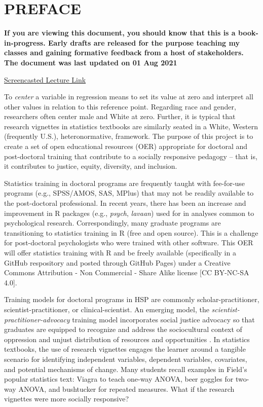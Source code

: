 \documentclass[
  english,
]{book}
\begin{document}
\hypertarget{preface}{%
\chapter*{PREFACE}\label{preface}}

\textbf{If you are viewing this document, you should know that this is a book-in-progress. Early drafts are released for the purpose teaching my classes and gaining formative feedback from a host of stakeholders. The document was last updated on 01 Aug 2021}

\href{https://spu.hosted.panopto.com/Panopto/Pages/Viewer.aspx?id=c932455e-ef06-444a-bdca-acf7012d759a}{Screencasted Lecture Link}

To \emph{center} a variable in regression means to set its value at zero and interpret all other values in relation to this reference point. Regarding race and gender, researchers often center male and White at zero. Further, it is typical that research vignettes in statistics textbooks are similarly seated in a White, Western (frequently U.S.), heteronormative, framework. The purpose of this project is to create a set of open educational resources (OER) appropriate for doctoral and post-doctoral training that contribute to a socially responsive pedagogy -- that is, it contributes to justice, equity, diversity, and inclusion.

Statistics training in doctoral programs are frequently taught with fee-for-use programs (e.g., SPSS/AMOS, SAS, MPlus) that may not be readily available to the post-doctoral professional. In recent years, there has been an increase and improvement in R packages (e.g., \emph{psych}, \emph{lavaan}) used for in analyses common to psychological research. Correspondingly, many graduate programs are transitioning to statistics training in R (free and open source). This is a challenge for post-doctoral psychologists who were trained with other software. This OER will offer statistics training with R and be freely available (specifically in a GitHub respository and posted through GitHub Pages) under a Creative Commons Attribution - Non Commercial - Share Alike license {[}CC BY-NC-SA 4.0{]}.

Training models for doctoral programs in HSP are commonly scholar-practitioner, scientist-practitioner, or clinical-scientist. An emerging model, the \emph{scientist-practitioner-advocacy} training model incorporates social justice advocacy so that graduates are equipped to recognize and address the sociocultural context of oppression and unjust distribution of resources and opportunities \citep{mallinckrodt_scientist-practitioner-advocate_2014}. In statistics textbooks, the use of research vignettes engages the learner around a tangible scenario for identifying independent variables, dependent variables, covariates, and potential mechanisms of change. Many students recall examples in Field's \citeyearpar{field_discovering_2012} popular statistics text: Viagra to teach one-way ANOVA, beer goggles for two-way ANOVA, and bushtucker for repeated measures. What if the research vignettes were more socially responsive?
\end{document}
